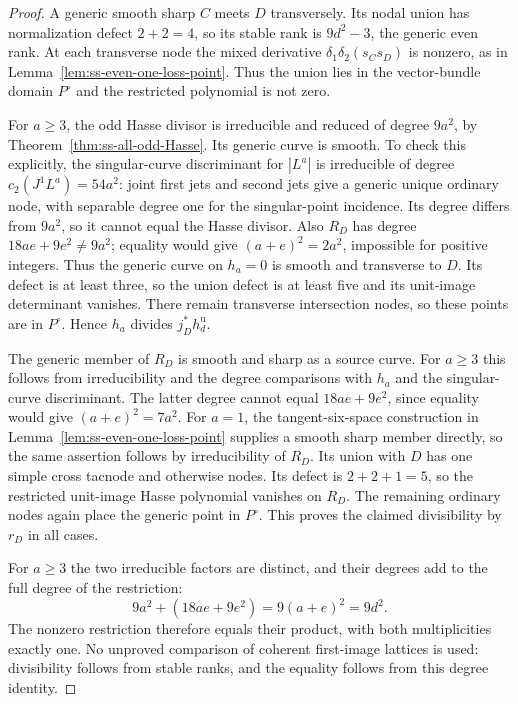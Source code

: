 \begin{proof}
A generic smooth sharp $C$ meets $D$ transversely. Its nodal
union has normalization defect $2+2=4$, so its stable rank is
$9d^2-3$, the generic even rank. At each transverse node the
mixed derivative $\delta_1\delta_2(s_Cs_D)$ is nonzero, as in
Lemma~\ref{lem:ss-even-one-loss-point}. Thus the union
lies in the vector-bundle domain $P^\circ$ and the restricted
polynomial is not zero.

For $a\ge3$, the odd Hasse divisor is irreducible and reduced
of degree $9a^2$, by Theorem~\ref{thm:ss-all-odd-Hasse}.
Its generic curve is smooth. To check this explicitly, the
singular-curve discriminant for $|L^a|$ is irreducible of
degree $c_2(J^1L^a)=54a^2$: joint first jets and second jets
give a generic unique ordinary node, with separable degree one
for the singular-point incidence. Its degree differs from
$9a^2$, so it cannot equal the Hasse divisor.
Also $R_D$ has degree $18ae+9e^2\ne9a^2$; equality would give
$(a+e)^2=2a^2$, impossible for positive integers.
Thus the generic curve on $h_a=0$ is smooth and transverse to
$D$. Its defect is at least three, so the union defect is at
least five and its unit-image determinant vanishes.
There remain transverse intersection nodes, so these points
are in $P^\circ$. Hence $h_a$ divides $j_D^*h_d^{\mathrm u}$.

The generic member of $R_D$ is smooth and sharp as a source
curve. For $a\ge3$ this follows from irreducibility and the
degree comparisons with $h_a$ and the singular-curve
discriminant. The latter degree cannot equal $18ae+9e^2$,
since equality would give $(a+e)^2=7a^2$.
For $a=1$, the tangent-six-space construction in
Lemma~\ref{lem:ss-even-one-loss-point} supplies a
smooth sharp member directly, so the same assertion follows
by irreducibility of $R_D$.
Its union with $D$ has one simple cross tacnode and otherwise
nodes. Its defect is $2+2+1=5$, so the restricted unit-image
Hasse polynomial vanishes on $R_D$. The remaining ordinary
nodes again place the generic point in $P^\circ$.
This proves the claimed divisibility by $r_D$ in all cases.

For $a\ge3$ the two irreducible factors are distinct, and
their degrees add to the full degree of the restriction:
\[
             9a^2+(18ae+9e^2)=9(a+e)^2=9d^2.
\]
The nonzero restriction therefore equals their product, with
both multiplicities exactly one. No unproved comparison of
coherent first-image lattices is used: divisibility follows
from stable ranks, and the equality follows from this degree
identity.
\end{proof}


